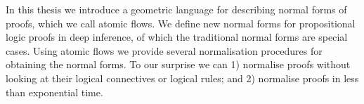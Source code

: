 In this thesis we introduce a geometric language for describing normal
forms of proofs, which we call atomic flows. We define new normal
forms for propositional logic proofs in deep inference, of which the
traditional normal forms are special cases. Using atomic flows we
provide several normalisation procedures for obtaining the normal
forms. To our surprise we can 1) normalise proofs without looking at
their logical connectives or logical rules; and 2) normalise proofs in
less than exponential time.